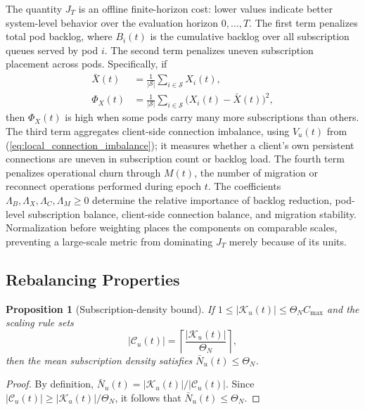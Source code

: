 \documentclass[manuscript,nonacm]{acmart}
\newtheorem{proposition}{Proposition}
\begin{document}
The quantity $J_T$ is an offline finite-horizon cost: lower values indicate
better system-level behavior over the evaluation horizon $0,\ldots,T$. The
first term penalizes total pod backlog, where $B_i(t)$ is the cumulative
backlog over all subscription queues served by pod $i$. The second term
penalizes uneven subscription placement across pods. Specifically, if
\begin{align*}
	\bar{X}(t)
	&=\frac{1}{|\mathcal{S}|}\sum_{i\in\mathcal{S}}X_i(t),\\
	\Phi_X(t)
	&=\frac{1}{|\mathcal{S}|}
	\sum_{i\in\mathcal{S}}\bigl(X_i(t)-\bar{X}(t)\bigr)^2,
\end{align*}
then $\Phi_X(t)$ is high when some pods carry many more subscriptions than
others. The third term aggregates client-side connection imbalance, using
$V_u(t)$ from (\ref{eq:local_connection_imbalance}); it measures whether a
client's own persistent connections are uneven in subscription count or
backlog load. The fourth term penalizes operational churn through $M(t)$, the
number of migration or reconnect operations performed during epoch $t$.
The coefficients
$\Lambda_B,\Lambda_X,\Lambda_C,\Lambda_M\geq 0$ determine the relative
importance of backlog reduction, pod-level subscription balance, client-side
connection balance, and migration stability. Normalization before weighting
places the components on comparable scales, preventing a large-scale metric
from dominating $J_T$ merely because of its units.

\subsection{Rebalancing Properties}

\begin{proposition}[Subscription-density bound]
If $1\leq|\mathcal{K}_u(t)|\leq \Theta_N C_{\max}$ and the scaling rule sets
\begin{equation}
	|\mathcal{C}_u(t)| =
	\left\lceil\frac{|\mathcal{K}_u(t)|}{\Theta_N}\right\rceil,
\end{equation}
then the mean subscription density satisfies $\bar{N}_u(t)\leq\Theta_N$.
\end{proposition}

\begin{proof}
By definition, $\bar{N}_u(t)=|\mathcal{K}_u(t)|/|\mathcal{C}_u(t)|$. Since
$|\mathcal{C}_u(t)|\geq |\mathcal{K}_u(t)|/\Theta_N$, it follows that
$\bar{N}_u(t)\leq\Theta_N$.
\end{proof}
\end{document}
